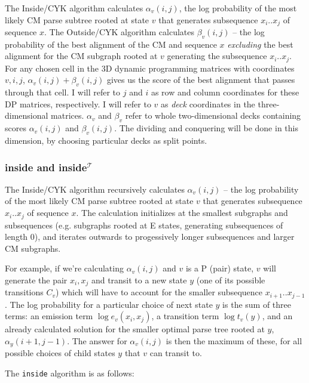 \documentclass[11pt]{article}
\begin{document}
The Inside/CYK algorithm calculates $\alpha_v(i,j)$, the log
probability of the most likely CM parse subtree rooted at state $v$
that generates subsequence $x_i..x_j$ of sequence $x$.  The
Outside/CYK algorithm calculates $\beta_v(i,j)$ -- the log probability
of the best alignment of the CM and sequence $x$ \emph{excluding} the
best alignment for the CM subgraph rooted at $v$ generating the
subsequence $x_i..x_j$.  For any chosen cell in the 3D dynamic
programming matrices with coordinates $v,i,j$, $\alpha_v(i,j) +
\beta_v(i,j)$ gives us the score of the best alignment that passes
through that cell. I will refer to $j$ and $i$ as row and column
coordinates for these DP matrices, respectively. I will refer to $v$
as \emph{deck} coordinates in the three-dimensional matrices.
$\alpha_{v}$ and $\beta_{v}$ refer to whole two-dimensional decks
containing scores $\alpha_v(i,j)$ and $\beta_v(i,j)$. The dividing and
conquering will be done in this dimension, by choosing particular
decks as split points.

\subsubsection{inside and inside$^{\mathcal{T}}$}

The Inside/CYK algorithm recursively calculates $\alpha_v(i,j)$ -- the
log probability of the most likely CM parse subtree rooted at state
$v$ that generates subsequence $x_i..x_j$ of sequence $x$. The
calculation initializes at the smallest subgraphs and subsequences
(e.g. subgraphs rooted at E states, generating subsequences of length
0), and iterates outwards to progessively longer subsequences and
larger CM subgraphs. 

For example, if we're calculating $\alpha_v(i,j)$ and $v$ is a P
(pair) state, $v$ will generate the pair $x_i,x_j$ and transit to a
new state $y$ (one of its possible transitions $C_v$) which will have
to account for the smaller subsequence $x_{i+1}..x_{j-1}$. The log
probability for a particular choice of next state $y$ is the sum of
three terms: an emission term $\log e_v(x_i,x_j)$, a transition term
$\log t_v(y)$, and an already calculated solution for the smaller
optimal parse tree rooted at $y$, $\alpha_y(i+1,j-1)$. The answer for
$\alpha_v(i,j)$ is then the maximum of these, for all possible choices
of child states $y$ that $v$ can transit to.

The \texttt{inside} algorithm is as follows:
\end{document}
